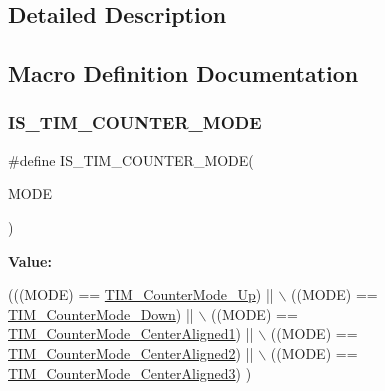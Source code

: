 \subsection{Detailed Description}


\subsection{Macro Definition Documentation}
\mbox{\label{group___t_i_m___counter___mode_ga9543fec190793e800d5d1b1b853636f5}} 
\subsubsection{\texorpdfstring{I\+S\+\_\+\+T\+I\+M\+\_\+\+C\+O\+U\+N\+T\+E\+R\+\_\+\+M\+O\+DE}{IS\_TIM\_COUNTER\_MODE}}
{\footnotesize\ttfamily \#define I\+S\+\_\+\+T\+I\+M\+\_\+\+C\+O\+U\+N\+T\+E\+R\+\_\+\+M\+O\+DE(\begin{DoxyParamCaption}\item[{}]{M\+O\+DE }\end{DoxyParamCaption})}

{\bfseries Value\+:}
\begin{DoxyCode}
(((MODE) == \hyperlink{group___t_i_m___counter___mode_gaf4cd3ce74af3122507b77c8f6e79c832}{TIM\_CounterMode\_Up}) ||  \(\backslash\)
                                   ((MODE) == \hyperlink{group___t_i_m___counter___mode_gadd7c4200d185bdcd9e64ae80e6b200b0}{TIM\_CounterMode\_Down}) || \(\backslash\)
                                   ((MODE) == \hyperlink{group___t_i_m___counter___mode_gac07392e9637f8a0d115d4ba9a002ae93}{TIM\_CounterMode\_CenterAligned1})
       || \(\backslash\)
                                   ((MODE) == \hyperlink{group___t_i_m___counter___mode_ga3793122e4c123a99e46fc2f04acea0d4}{TIM\_CounterMode\_CenterAligned2})
       || \(\backslash\)
                                   ((MODE) == \hyperlink{group___t_i_m___counter___mode_ga65d9bc01ffa287cd7cf200d08c20a1ce}{TIM\_CounterMode\_CenterAligned3})
      )
\end{DoxyCode}


